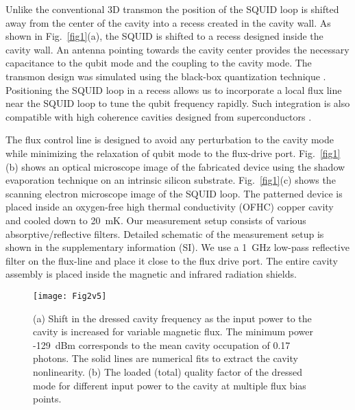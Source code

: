 \documentclass[a4paper, amsfonts, amssymb, amsmath, reprint,showkeys,nofootinbib,superscriptaddress]{revtex4-2}
\begin{document}
Unlike the conventional 3D transmon the position of the SQUID loop is shifted away 
from the center of the cavity into a 
recess created in the cavity wall\cite{paik_observation_2011, juliusson_manipulating_2016}. 
%
As shown in Fig.~\ref{fig1}(a), the SQUID is shifted to a recess designed inside
the cavity wall. An antenna pointing towards the cavity center provides the 
necessary capacitance to the qubit mode and the coupling to the cavity mode.
%
The transmon design was simulated using the black-box quantization 
technique \cite{nigg_black-box_2012}. Positioning the SQUID loop in a 
recess allows us to incorporate a local flux line near the SQUID loop 
to tune the qubit frequency rapidly. Such integration is also compatible 
with high coherence cavities designed from superconductors \cite{gargiulo_fast_2021, 
	reshitnyk_3d_2016, navau_long-distance_2014}.



%
The flux control line is designed to avoid any perturbation to the cavity mode 
while minimizing the relaxation of qubit mode to the flux-drive port. 
%
Fig.~\ref{fig1}(b) shows an optical microscope image of the fabricated device 
using the shadow evaporation technique on an intrinsic silicon substrate. 
Fig.~\ref{fig1}(c) shows the scanning electron microscope image of the SQUID loop.
The patterned device is placed inside an oxygen-free high thermal conductivity 
(OFHC) copper cavity and cooled down to 20~mK. 
Our measurement setup consists of various absorptive/reflective
filters. 
Detailed schematic of the measurement setup is shown in 
the supplementary information (SI).
%
We use a 1~GHz low-pass reflective filter on the flux-line and place it close to
the flux drive port. The entire cavity assembly is placed inside the magnetic and
infrared radiation shields. 




\begin{figure*}
	\texttt{[image: Fig2v5]}
	\caption{(a) Shift in the dressed cavity frequency as the input power to the 
		cavity is increased for variable magnetic flux. The minimum power 
		-129~dBm  corresponds to the mean cavity occupation of 0.17 photons. The 
		solid lines are numerical fits to extract the cavity nonlinearity. (b) The 
		loaded (total) quality factor of the dressed mode for different input power to the 
		cavity at multiple flux bias points.}
	\label{fig2}
\end{figure*}
\end{document}
